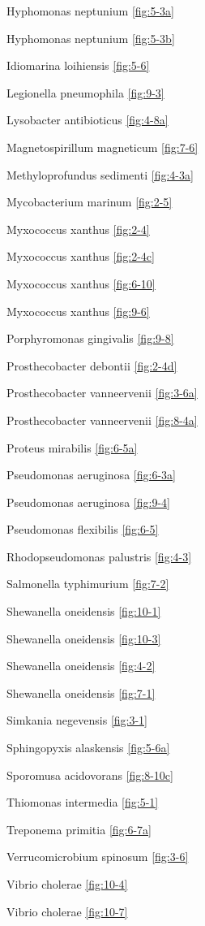 \documentclass[]{tufte-book}
\begin{document}
Hyphomonas neptunium \ref{fig:5-3a}

Hyphomonas neptunium \ref{fig:5-3b}

Idiomarina loihiensis \ref{fig:5-6}

Legionella pneumophila \ref{fig:9-3}

Lysobacter antibioticus \ref{fig:4-8a}

Magnetospirillum magneticum \ref{fig:7-6}

Methyloprofundus sedimenti \ref{fig:4-3a}

Mycobacterium marinum \ref{fig:2-5}

Myxococcus xanthus \ref{fig:2-4}

Myxococcus xanthus \ref{fig:2-4c}

Myxococcus xanthus \ref{fig:6-10}

Myxococcus xanthus \ref{fig:9-6}

Porphyromonas gingivalis \ref{fig:9-8}

Prosthecobacter debontii \ref{fig:2-4d}

Prosthecobacter vanneervenii \ref{fig:3-6a}

Prosthecobacter vanneervenii \ref{fig:8-4a}

Proteus mirabilis \ref{fig:6-5a}

Pseudomonas aeruginosa \ref{fig:6-3a}

Pseudomonas aeruginosa \ref{fig:9-4}

Pseudomonas flexibilis \ref{fig:6-5}

Rhodopseudomonas palustris \ref{fig:4-3}

Salmonella typhimurium \ref{fig:7-2}

Shewanella oneidensis \ref{fig:10-1}

Shewanella oneidensis \ref{fig:10-3}

Shewanella oneidensis \ref{fig:4-2}

Shewanella oneidensis \ref{fig:7-1}

Simkania negevensis \ref{fig:3-1}

Sphingopyxis alaskensis \ref{fig:5-6a}

Sporomusa acidovorans \ref{fig:8-10c}

Thiomonas intermedia \ref{fig:5-1}

Treponema primitia \ref{fig:6-7a}

Verrucomicrobium spinosum \ref{fig:3-6}

Vibrio cholerae \ref{fig:10-4}

Vibrio cholerae \ref{fig:10-7}
\end{document}
